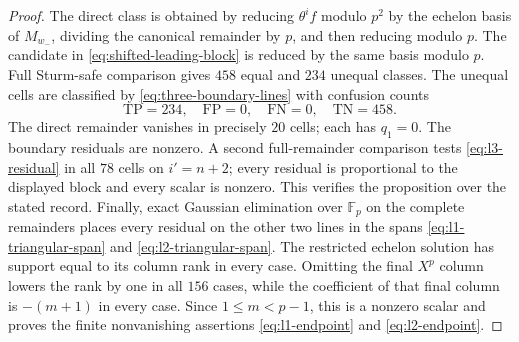 \begin{proof}
The direct class is obtained by reducing $\theta^if$ modulo $p^2$ by the
echelon basis of $M_{w_-}$, dividing the canonical remainder by $p$, and
then reducing modulo $p$.  The candidate in
\eqref{eq:shifted-leading-block} is reduced by the same basis modulo $p$.
Full Sturm-safe comparison gives $458$ equal and $234$ unequal classes.
The unequal cells are classified by
\eqref{eq:three-boundary-lines} with confusion counts
\[
 \mathrm{TP}=234,\quad \mathrm{FP}=0,
 \quad \mathrm{FN}=0,\quad \mathrm{TN}=458.
\]
The direct remainder vanishes in precisely $20$ cells; each has $q_1=0$.
The boundary residuals are nonzero.  A second full-remainder comparison
tests \eqref{eq:l3-residual} in all $78$ cells on $i'=n+2$; every residual
is proportional to the displayed block and every scalar is nonzero.  This
verifies the proposition over the stated record.  Finally, exact Gaussian
elimination over $\mathbb F_p$ on the complete remainders places every
residual on the other two lines in the spans
\eqref{eq:l1-triangular-span} and \eqref{eq:l2-triangular-span}.  The
restricted echelon solution has support equal to its column rank in every
case.  Omitting the final $X^p$ column lowers the rank by one in all $156$
cases, while the coefficient of that final column is $-(m+1)$ in every
case.  Since $1\le m<p-1$, this is a nonzero scalar and proves the finite
nonvanishing assertions \eqref{eq:l1-endpoint} and
\eqref{eq:l2-endpoint}.
\end{proof}

